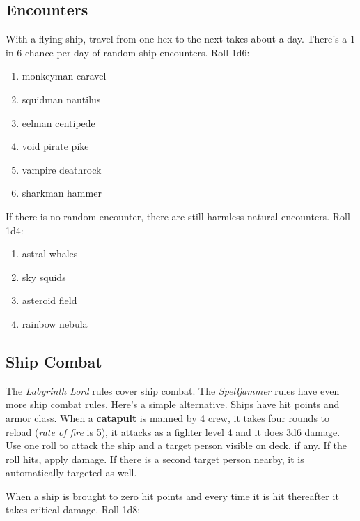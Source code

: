 \documentclass[11pt]{bxart}
\begin{document}
\subsection{Encounters}

With a flying ship, travel from one hex to the next takes about a day.
There's a 1 in 6 chance per day of random ship encounters. Roll 1d6:

\begin{enumerate}
\item monkeyman caravel
\item squidman nautilus
\item eelman centipede
\item void pirate pike
\item vampire deathrock 
\item sharkman hammer
\end{enumerate}

If there is no random encounter, there are still harmless natural
encounters. Roll 1d4:

\begin{enumerate}
\item astral whales
\item sky squids
\item asteroid field
\item rainbow nebula
\end{enumerate}

\newpage

\subsection{Ship Combat}

The \textit{Labyrinth Lord} rules cover ship combat. The
\textit{Spelljammer} rules have even more ship combat rules. Here's a
simple alternative. Ships have hit points and armor class. When a
\textbf{catapult} is manned by 4 crew, it takes four rounds to reload
(\textit{rate of fire} is 5), it attacks as a fighter level 4 and it
does 3d6 damage. Use one roll to attack the ship and a target person
visible on deck, if any. If the roll hits, apply damage. If there is a
second target person nearby, it is automatically targeted as well.

When a ship is brought to zero hit points and every time it is hit
thereafter it takes critical damage. Roll 1d8:
\end{document}
